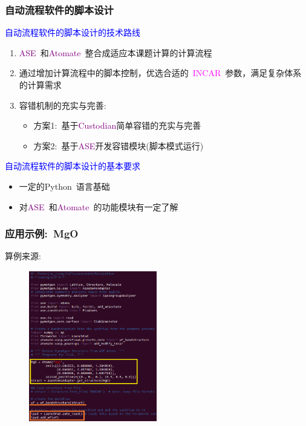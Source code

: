 \documentclass[cjk,slidestop,handout,compress,mathserif,blue]{beamer}	%
\begin{document}
{
	\frametitle{自动流程软件的脚本设计}
	\textcolor{blue}{自动流程软件的脚本设计的技术路线}
	\begin{enumerate}
		\item \textcolor{purple}{\textrm{ASE~}}和\textcolor{purple}{\textrm{Atomate~}}整合成适应本课题计算的计算流程
		\item 通过增加计算流程中的脚本控制，优选合适的\textcolor{magenta}{\textrm{~INCAR}}~参数，满足复杂体系的计算需求
		\item 容错机制的充实与完善:%
	 \begin{itemize}
		 \item 方案1:~基于\textcolor{purple}{\textrm{Custodian}}简单容错的充实与完善%
		 \item 方案2:~基于\textcolor{purple}{\textrm{ASE}}开发容错模块(脚本模式运行)
	 \end{itemize}
	\end{enumerate}
	\textcolor{blue}{自动流程软件的脚本设计的基本要求}
				\begin{itemize}
					\item 一定的\textrm{Python~}语言基础
					\item 对\textcolor{purple}{\textrm{ASE~}}和\textcolor{purple}{\textrm{Atomate~}}的功能模块有一定了解
				\end{itemize}
}

\frame
{
	\frametitle{\textrm{应用示例:~\textrm{MgO}}}
	算例来源:~\fontsize{7.5pt}{6.2pt}
\begin{figure}[h!]
\centering
\vspace*{-0.05in}
\hspace*{-0.10in}
\includegraphics[height=2.6in,width=2.2in,viewport=0 0 475 515,clip]{Figures/Atomate-ASE_MgO.png}
\label{Atomate-ASE_MgO}
\end{figure} 
}
\end{document}
